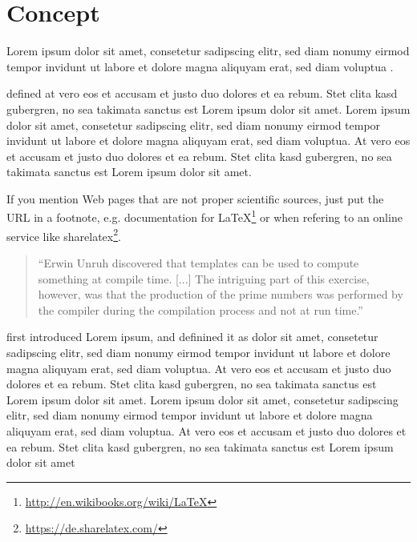 \documentclass[12pt,a4paper]{article}
\title{\titlename}
\author{ \authorname\\ \scriptsize \authormail \\ \scriptsize \address }
\date{\exposedate}
\begin{document}
\maketitle

\section*{Concept}

Lorem ipsum dolor sit amet, consetetur sadipscing elitr, sed diam nonumy eirmod tempor invidunt ut labore et dolore magna aliquyam erat, sed diam voluptua \autocite[]{McConnell:2004:CCS:1096143}.

\textcite[]{Vandevoorde:2002} defined at vero eos et accusam et justo duo dolores et ea rebum. Stet clita kasd gubergren, no sea takimata sanctus est Lorem ipsum dolor sit amet. Lorem ipsum dolor sit amet, consetetur sadipscing elitr, sed diam nonumy eirmod tempor invidunt ut labore et dolore magna aliquyam erat, sed diam voluptua. At vero eos et accusam et justo duo dolores et ea rebum. Stet clita kasd gubergren, no sea takimata sanctus est Lorem ipsum dolor sit amet.

If you mention Web pages that are not proper scientific sources, just put the URL in a footnote, e.g. documentation for \LaTeX\footnote{\url{http://en.wikibooks.org/wiki/LaTeX}}
or when refering to an online service like  sharelatex\footnote{\url{https://de.sharelatex.com/}}.


\begin{quote}
``Erwin Unruh discovered that templates can be used to compute
something at compile time. [...] The intriguing part of this exercise, however, was that the production of the prime numbers was performed by the compiler during the compilation process and not at run time.''
\autocite[305]{Vandevoorde:2002}
\end{quote}

\textcite[]{Vandevoorde:2002} first introduced Lorem ipsum, and definined it as dolor sit amet, consetetur sadipscing elitr, sed diam nonumy eirmod tempor invidunt ut labore et dolore magna aliquyam erat, sed diam voluptua. At vero eos et accusam et justo duo dolores et ea rebum. Stet clita kasd gubergren, no sea takimata sanctus est Lorem ipsum dolor sit amet. Lorem ipsum dolor sit amet, consetetur sadipscing elitr, sed diam nonumy eirmod tempor invidunt ut labore et dolore magna aliquyam erat, sed diam voluptua. At vero eos et accusam et justo duo dolores et ea rebum. Stet clita kasd gubergren, no sea takimata sanctus est Lorem ipsum dolor sit amet 
\end{document}
